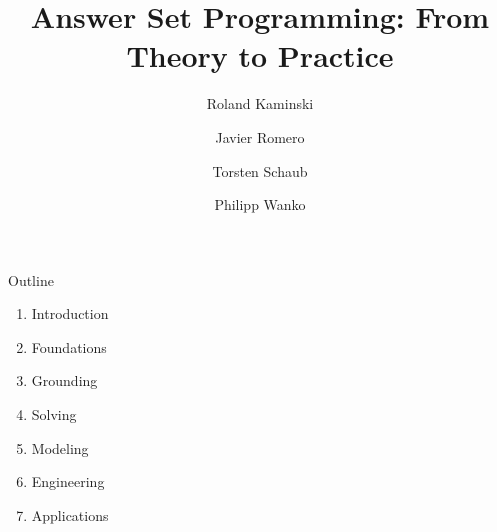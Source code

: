 \documentclass[t,fleqn]{beamer}
\title[Answer Set Programming]{Answer Set Programming: From Theory to Practice}
\author[Potassco]{Roland Kaminski \and Javier Romero \and Torsten Schaub \and Philipp Wanko}
\institute[KRR@UP]{University of Potsdam\\\bigskip\bigskip\texttt{[image: potassco\_logo\_lightblue]}}
\date{}
\begin{document}
\frame{\titlepage}
\begin{frame}{Outline}
  \bigskip
  \begin{enumerate}
  \item Introduction
  \item Foundations
  \item Grounding
  \item Solving
  \item Modeling
  \item Engineering
  \item Applications
  \end{enumerate}
\end{frame}


\end{document}
